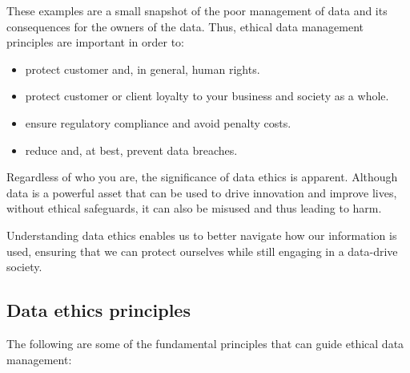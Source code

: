 \documentclass[
]{book}
\begin{document}
These examples are a small snapshot of the poor management of data and its consequences for the owners of the data. Thus, ethical data management principles are important in order to:

\begin{itemize}
\item
  protect customer and, in general, human rights.
\item
  protect customer or client loyalty to your business and society as a whole.
\item
  ensure regulatory compliance and avoid penalty costs.
\item
  reduce and, at best, prevent data breaches.
\end{itemize}

Regardless of who you are, the significance of data ethics is apparent. Although data is a powerful asset that can be used to drive innovation and improve lives, without ethical safeguards, it can also be misused and thus leading to harm.

Understanding data ethics enables us to better navigate how our information is used, ensuring that we can protect ourselves while still engaging in a data-drive society.

\subsection{Data ethics principles}\label{data-ethics-principles}

The following are some of the fundamental principles that can guide ethical data management:
\end{document}
